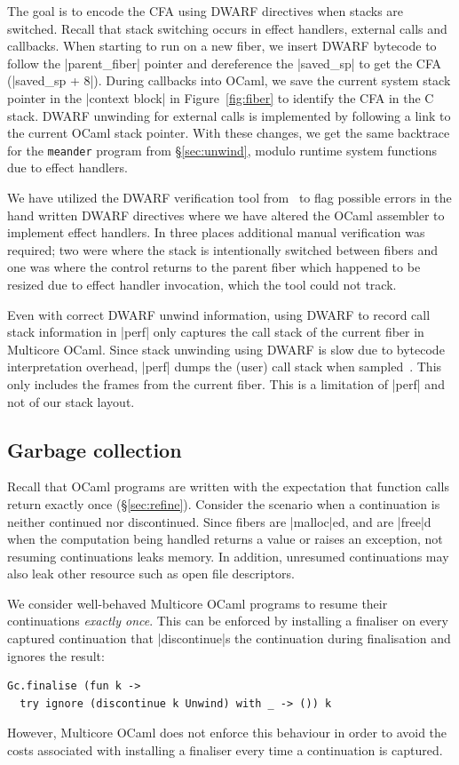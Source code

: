 \documentclass[sigplan,10pt,review,anonymous]{acmart}\settopmatter{printfolios=true,printccs=false,printacmref=false}
\begin{document}
The goal is to encode the CFA using DWARF directives when stacks are switched.
Recall that stack switching occurs in effect handlers, external calls and
callbacks. When starting to run on a new fiber, we insert DWARF bytecode to
follow the |parent_fiber| pointer and dereference the |saved_sp| to get the CFA
(|saved_sp + 8|). During callbacks into OCaml, we save the current system stack
pointer in the |context block| in Figure~\ref{fig:fiber} to identify the CFA in
the C stack. DWARF unwinding for external calls is implemented by following a
link to the current OCaml stack pointer. With these changes, we get the same
backtrace for the \texttt{meander} program from \S\ref{sec:unwind}, modulo
runtime system functions due to effect handlers.

We have utilized the DWARF verification tool from~\cite{Bastian19} to flag
possible errors in the hand written DWARF directives where we have altered the
OCaml assembler to implement effect handlers. In three places additional manual
verification was required; two were where the stack is intentionally switched
between fibers and one was where the control returns to the parent fiber which
happened to be resized due to effect handler invocation, which the tool could
not track.

Even with correct DWARF unwind information, using DWARF to record call stack
information in |perf| only captures the call stack of the current fiber in
Multicore OCaml. Since stack unwinding using DWARF is slow due to bytecode
interpretation overhead, |perf| dumps the (user) call stack when
sampled~\cite{Bastian19}. This only includes the frames from the current fiber.
This is a limitation of |perf| and not of our stack layout.

\subsection{Garbage collection}

Recall that OCaml programs are written with the expectation that function calls
return exactly once (\S\ref{sec:refine}). Consider the scenario when a
continuation is neither continued nor discontinued. Since fibers are
|malloc|ed, and are |free|d when the computation being handled returns a value
or raises an exception, not resuming continuations leaks memory. In addition,
unresumed continuations may also leak other resource such as open file
descriptors.

We consider well-behaved Multicore OCaml programs to resume their continuations
\emph{exactly once}. This can be enforced by installing a finaliser on every
captured continuation that |discontinue|s the continuation during finalisation
and ignores the result:
\begin{lstlisting}
Gc.finalise (fun k ->
  try ignore (discontinue k Unwind) with _ -> ()) k
\end{lstlisting}
However, Multicore OCaml does not enforce this behaviour in order to avoid the
costs associated with installing a finaliser every time a continuation is
captured.
\end{document}
